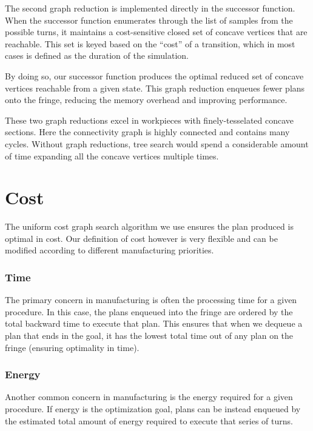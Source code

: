 The second graph reduction is implemented directly in the successor function. When the successor function enumerates through the list of samples from the possible turns, it maintains a cost-sensitive closed set of concave vertices that are reachable. This set is keyed based on the ``cost'' of a transition, which in most cases is defined as the duration of the simulation.

By doing so, our successor function produces the optimal reduced set of concave vertices reachable from a given state. This graph reduction enqueues fewer plans onto the fringe, reducing the memory overhead and improving performance.

These two graph reductions excel in workpieces with finely-tesselated concave sections. Here the connectivity graph is highly connected and contains many cycles. Without graph reductions, tree search would spend a considerable amount of time expanding all the concave vertices multiple times.


\section{Cost}

The uniform cost graph search algorithm we use ensures the plan produced is optimal in cost. Our definition of cost however is very flexible and can be modified according to different manufacturing priorities.

		\subsubsection{Time}

The primary concern in manufacturing is often the processing time for a given procedure. In this case, the plans enqueued into the fringe are ordered by the total backward time to execute that plan. This ensures that when we dequeue a plan that ends in the goal, it has the lowest total time out of any plan on the fringe (ensuring optimality in time).

		\subsubsection{Energy}

Another common concern in manufacturing is the energy required for a given procedure. If energy is the optimization goal, plans can be instead enqueued by the estimated total amount of energy required to execute that series of turns.


